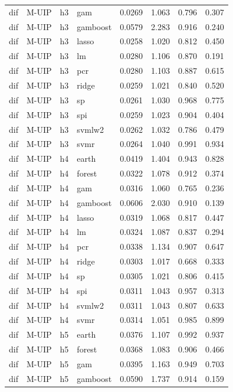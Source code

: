 \begin{ThreePartTable}
\begin{longtable}[t]{llclcccc}
dif & M-UIP & h3 & gam & 0.0269 & 1.063 & 0.796 & 0.307\\
dif & M-UIP & h3 & gamboost & 0.0579 & 2.283 & 0.916 & 0.240\\
dif & M-UIP & h3 & lasso & 0.0258 & 1.020 & 0.812 & 0.450\\
dif & M-UIP & h3 & lm & 0.0280 & 1.106 & 0.870 & 0.191\\
dif & M-UIP & h3 & pcr & 0.0280 & 1.103 & 0.887 & 0.615\\
dif & M-UIP & h3 & ridge & 0.0259 & 1.021 & 0.840 & 0.520\\
dif & M-UIP & h3 & sp & 0.0261 & 1.030 & 0.968 & 0.775\\
dif & M-UIP & h3 & spi & 0.0259 & 1.023 & 0.904 & 0.404\\
dif & M-UIP & h3 & svmlw2 & 0.0262 & 1.032 & 0.786 & 0.479\\
dif & M-UIP & h3 & svmr & 0.0264 & 1.040 & 0.991 & 0.934\\
\addlinespace
dif & M-UIP & h4 & earth & 0.0419 & 1.404 & 0.943 & 0.828\\
dif & M-UIP & h4 & forest & 0.0322 & 1.078 & 0.912 & 0.374\\
dif & M-UIP & h4 & gam & 0.0316 & 1.060 & 0.765 & 0.236\\
dif & M-UIP & h4 & gamboost & 0.0606 & 2.030 & 0.910 & 0.139\\
dif & M-UIP & h4 & lasso & 0.0319 & 1.068 & 0.817 & 0.447\\
dif & M-UIP & h4 & lm & 0.0324 & 1.087 & 0.837 & 0.294\\
dif & M-UIP & h4 & pcr & 0.0338 & 1.134 & 0.907 & 0.647\\
dif & M-UIP & h4 & ridge & 0.0303 & 1.017 & 0.668 & 0.333\\
dif & M-UIP & h4 & sp & 0.0305 & 1.021 & 0.806 & 0.415\\
dif & M-UIP & h4 & spi & 0.0311 & 1.043 & 0.957 & 0.313\\
dif & M-UIP & h4 & svmlw2 & 0.0311 & 1.043 & 0.807 & 0.633\\
dif & M-UIP & h4 & svmr & 0.0314 & 1.051 & 0.985 & 0.899\\
\addlinespace
dif & M-UIP & h5 & earth & 0.0376 & 1.107 & 0.992 & 0.937\\
dif & M-UIP & h5 & forest & 0.0368 & 1.083 & 0.906 & 0.466\\
dif & M-UIP & h5 & gam & 0.0395 & 1.163 & 0.949 & 0.703\\
dif & M-UIP & h5 & gamboost & 0.0590 & 1.737 & 0.914 & 0.159\\

\end{longtable}
\end{ThreePartTable}
